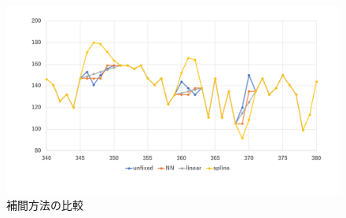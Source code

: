 \begin{figure}[!htb]
  \centering
  \includegraphics[width = 15cm, bb= 0 0 1000 600]{chapter3/interp.png}
  \caption{補間方法の比較}
  \label{interp}
\end{figure}


